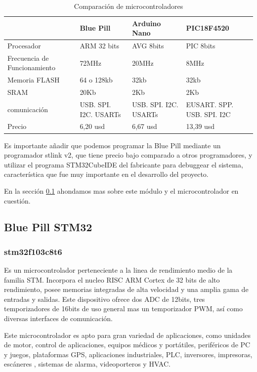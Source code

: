 \begin{table}[t]
    \begin{center}
        \begin{tabular}{ | m{3cm} | m{3cm} | m{3cm} | m{3cm} | }
        \hline  & Blue Pill & Arduino Nano & PIC18F4520  \\ \hline
        Procesador & ARM 32 bits & AVG 8bits & PIC 8bits \\ \hline
        Frecuencia de Funcionamiento & 72MHz &20MHz & 8MHz \\ \hline
        Memoria FLASH & 64 o 128kb & 32kb & 32kb\\ \hline
        SRAM & 20Kb & 2Kb & 2Kb \\ \hline
        comunicación & USB. SPI. I2C. USARTs &  USB. SPI. I2C. USARTs & EUSART. SPP. USB. SPI. I2C\\ \hline
        Precio & 6,20 usd &  6,67 usd & 13,39 usd\\ \hline
        
        \end{tabular}
        \caption{Comparación de microcontroladores}
        \label{tab:uC}   
    \end{center}
\end{table}

Es importante añadir que podemos programar la Blue Pill mediante un programador stlink v2, que tiene precio bajo comparado a otros programadores, y
utilizar el programa STM32CubeIDE del fabricante para debuggear el sistema, característica que fue muy importante en el desarrollo del proyecto.\par
En la sección \ref{cap:stm32} ahondamos mas sobre este módulo y el microcontrolador en cuestión. 

\subsection{Blue Pill STM32} \label{cap:stm32}
\subsubsection{stm32f103c8t6}

Es un microcontrolador perteneciente a la linea de rendimiento medio de la familia STM. Incorpora el nucleo RISC ARM Cortex de 32 bits de alto rendimiento,
posee memorias integradas de alta velocidad y una amplia gama de entradas y salidas. Este dispositivo ofrece dos ADC de 12bits, tres temporizadores de 16bits
de uso general mas un temporizador PWM, así como diversas interfaces de comunicación.\par 
Este microcontrolador es apto para gran variedad de aplicaciones, como unidades de motor, control de aplicaciones, equipos médicos y portátiles, periféricos
de PC y juegos, plataformas GPS, aplicaciones industriales, PLC, inversores, impresoras, escáneres , sistemas de alarma, videoporteros y HVAC.

